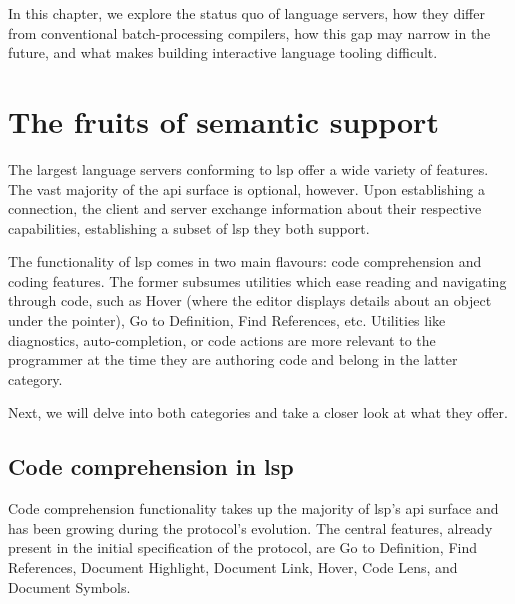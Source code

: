 In this chapter, we explore the status quo of language servers, how they differ
from conventional batch-processing compilers, how this gap may narrow in the
future, and what makes building interactive language tooling difficult.

\section{The fruits of semantic support}


The largest language servers conforming to \acrshort{lsp} offer a wide variety
of features. The vast majority of the \acrshort{api} surface is optional,
however. Upon establishing a connection, the client and server exchange
information about their respective capabilities, establishing a subset of
\acrshort{lsp} they both support.

The functionality of \acrshort{lsp} comes in two main flavours: code
comprehension and coding features. The former subsumes utilities which ease
reading and navigating through code, such as Hover (where the editor displays
details about an object under the pointer), Go to Definition, Find References,
etc. Utilities like diagnostics, auto-completion, or code actions are more
relevant to the programmer at the time they are authoring code and belong in the
latter category.

Next, we will delve into both categories and take a closer look at what they
offer.


\subsection{Code comprehension in \acrshort{lsp}}


\newcommand{\org}{\pdftooltip{(original)}{This request was present in the
original LSP specification.}}

Code comprehension functionality takes up the majority of \acrshort{lsp}'s
\acrshort{api} surface and has been growing during the protocol's evolution. The
central features, already present in the initial specification of the protocol,
are Go to Definition, Find References, Document Highlight, Document Link, Hover,
Code Lens, and Document Symbols.

